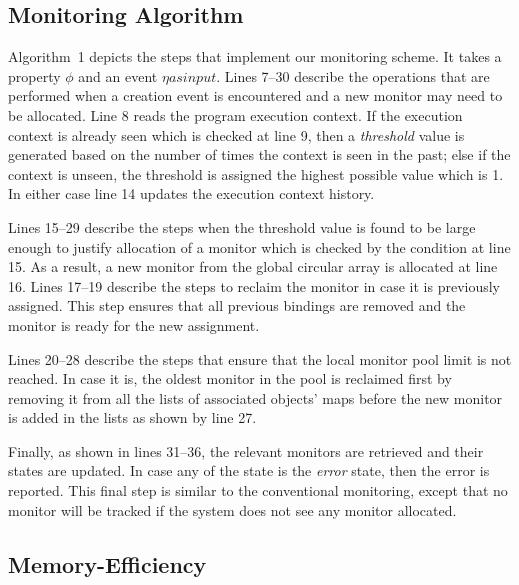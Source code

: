 \subsection{Monitoring Algorithm}
\label{subsec:algo}

Algorithm~1 depicts the steps that implement our monitoring scheme. It takes a
property $\phi$ and an event $\eta as input. $ Lines 7--30 
describe the operations that are performed when a creation event is encountered 
and a new monitor may need to be allocated. Line 8 reads the program execution 
context. If the execution context is already seen which is checked at line 9, 
then a \textit{threshold} value is generated based on the number of times the 
context is seen in the past; else if the context is unseen, the threshold is 
assigned the highest possible value which is 1. In either case line 14 updates 
the execution context history.

Lines 15--29 describe the steps when the threshold value is found to be large 
enough to justify allocation of a monitor which is checked by the condition at 
line 15. As a result, a new monitor from the global circular array is allocated
at line 16. Lines 17--19 describe the steps to reclaim the monitor in case it is previously 
assigned. This step ensures that all previous bindings are removed and the 
monitor is ready for the new assignment.

Lines 20--28 describe the steps that ensure that the local monitor pool limit is 
not reached. In case it is, the oldest monitor in the pool is reclaimed first by 
removing it from all the lists of associated objects' maps before the new monitor 
is added in the lists as shown by line 27.

Finally, as shown in lines 31--36, the relevant monitors are retrieved and their 
states are updated. In case any of the state is the \textit{error} state, then 
the error is reported. This final step is similar to the conventional 
monitoring, except that no monitor will be tracked if the system does not see 
any monitor allocated.


\subsection{Memory-Efficiency }
\label{subsec:memory efficiency}

